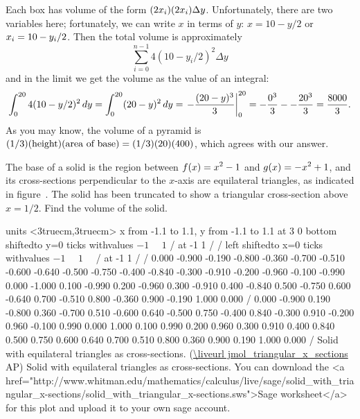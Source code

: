 Each box has volume of the form $\displaystyle (2x_i)(2x_i)\Delta y$. Unfortunately,
there are two variables here; fortunately, we can write $x$ in terms
of $y$: $x=10-y/2$ or $\displaystyle x_i=10-y_i/2$. Then the total volume is
approximately
$$\sum_{i=0}^{n-1} 4(10-y_i/2)^2\Delta y$$
and in the limit we get the volume as the value of an integral:
$$
  \int_0^{20} 4(10-y/2)^2\,dy=\int_0^{20} (20-y)^2\,dy=
  \left.-{(20-y)^3\over3}\right|_0^{20}=
  -{0^3\over3}--{20^3\over3}={8000\over3}.
$$
As you may know, the volume of a pyramid is 
$(1/3)(\hbox{height})(\hbox{area of base})=(1/3)(20)(400)$, which
agrees with our answer.
\endexample

\example
The base of a solid is the region between $\displaystyle f(x)=x^2-1$ and
$\displaystyle g(x)=-x^2+1$, and its cross-sections perpendicular to the $x$-axis 
are equilateral triangles, as indicated in
figure~.
\texonly
The solid has been truncated to show a triangular
cross-section above $x=1/2$.
\endtexonly
Find the volume of the solid.

\figure
\texonly
\vbox{\beginpicture
\normalgraphs
\ninepoint
\setcoordinatesystem units <3truecm,3truecm>
\setplotarea x from -1.1 to 1.1, y from -1.1 to 1.1
 at 3 0
\axis bottom shiftedto y=0 ticks withvalues {$-1\quad$} {$1$} / at -1 1 / /
\axis left shiftedto x=0 ticks withvalues {$-1\quad$} {$1\quad$} / at -1 1 / /
 0.000 -0.900 -0.190 -0.800 -0.360 -0.700 -0.510 -0.600 -0.640 
-0.500 -0.750 -0.400 -0.840 -0.300 -0.910 -0.200 -0.960 -0.100 -0.990 
0.000 -1.000 0.100 -0.990 0.200 -0.960 0.300 -0.910 0.400 -0.840 
0.500 -0.750 0.600 -0.640 0.700 -0.510 0.800 -0.360 0.900 -0.190 
1.000 0.000 /
 0.000 -0.900 0.190 -0.800 0.360 -0.700 0.510 -0.600 0.640 
-0.500 0.750 -0.400 0.840 -0.300 0.910 -0.200 0.960 -0.100 0.990 
0.000 1.000 0.100 0.990 0.200 0.960 0.300 0.910 0.400 0.840 
0.500 0.750 0.600 0.640 0.700 0.510 0.800 0.360 0.900 0.190 
1.000 0.000 /
\endpicture}
\begincaption
{Solid with equilateral triangles as cross-sections.
(\expandafter\url\expandafter{\liveurl jmol_triangular_x_sections}%
AP\endurl)}
\endcaption
\endtexonly
{}
\htmlonly
\begincaption
Solid with equilateral triangles as cross-sections.
You can download the <a href="http://www.whitman.edu/mathematics/calculus/live/sage/solid_with_triangular_x-sections/solid_with_triangular_x-sections.sws">Sage
worksheet</a>
for this plot and upload it to your own sage account.
\endcaption
\endhtmlonly
\endfigure

